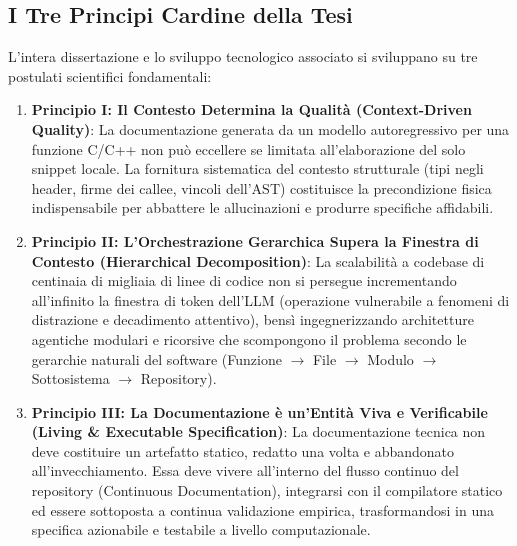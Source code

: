 \subsection{I Tre Principi Cardine della Tesi}
\label{subsec:tre_principi}
L'intera dissertazione e lo sviluppo tecnologico associato si sviluppano su tre postulati scientifici fondamentali:
\begin{enumerate}
    \item \textbf{Principio I: Il Contesto Determina la Qualità (Context-Driven Quality)}: La documentazione generata da un modello autoregressivo per una funzione C/C++ non può eccellere se limitata all'elaborazione del solo snippet locale. La fornitura sistematica del contesto strutturale (tipi negli header, firme dei callee, vincoli dell'AST) costituisce la precondizione fisica indispensabile per abbattere le allucinazioni e produrre specifiche affidabili.
    \item \textbf{Principio II: L'Orchestrazione Gerarchica Supera la Finestra di Contesto (Hierarchical Decomposition)}: La scalabilità a codebase di centinaia di migliaia di linee di codice non si persegue incrementando all'infinito la finestra di token dell'LLM (operazione vulnerabile a fenomeni di distrazione e decadimento attentivo), bensì ingegnerizzando architetture agentiche modulari e ricorsive che scompongono il problema secondo le gerarchie naturali del software (Funzione $\to$ File $\to$ Modulo $\to$ Sottosistema $\to$ Repository).
    \item \textbf{Principio III: La Documentazione è un'Entità Viva e Verificabile (Living \& Executable Specification)}: La documentazione tecnica non deve costituire un artefatto statico, redatto una volta e abbandonato all'invecchiamento. Essa deve vivere all'interno del flusso continuo del repository (Continuous Documentation), integrarsi con il compilatore statico ed essere sottoposta a continua validazione empirica, trasformandosi in una specifica azionabile e testabile a livello computazionale.
\end{enumerate}

